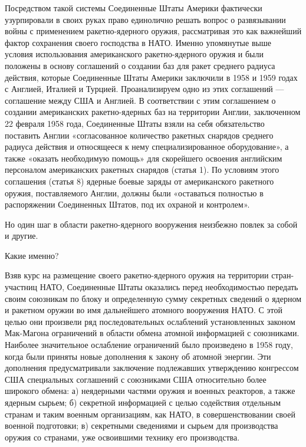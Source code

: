 \documentclass[12pt, a4paper, openany]{book}
\begin{document}
	Посредством такой системы Соединенные Штаты Америки фактически узурпировали в своих руках право единолично решать вопрос о развязывании войны с применением ракетно-ядерного оружия, рассматривая это как важнейший фактор сохранения своего господства в НАТО. Именно упомянутые выше условия использования американского ракетно-ядерного оружия и были положены в основу соглашений о создании баз для ракет среднего радиуса действия, которые Соединенные Штаты Америки заключили в 1958 и 1959 годах с Англией, Италией и Турцией. Проанализируем одно из этих соглашений — соглашение между США и Англией. В соответствии с этим соглашением о создании американских ракетно-ядерных баз на территории Англии, заключенном 22 февраля 1958 года, Соединенные Штаты взяли на себя обязательство поставить Англии «согласованное количество ракетных снарядов среднего радиуса действия и относящееся к нему специализированное оборудование», а также «оказать необходимую помощь» для скорейшего освоения английским персоналом американских ракетных снарядов (статья 1). По условиям этого соглашения (статья 8) ядерные боевые заряды от американского ракетного оружия, поставляемого Англии, должны были «оставаться полностью в распоряжении Соединенных Штатов, под их охраной и контролем».
	
	Но один шаг в области ракетно-ядерного вооружения неизбежно повлек за собой и другие.
	
	Какие именно?
	
	Взяв курс на размещение своего ракетно-ядерного оружия на территории стран-участниц НАТО, Соединенные Штаты оказались перед необходимостью передать своим союзникам по блоку и определенную сумму секретных сведений о ядерном и ракетном оружии во имя дальнейшего атомного вооружения НАТО. С этой целью они произвели ряд последовательных ослаблений установленных законом Мак-Магона ограничений в области обмена атомной информацией с союзниками. Наиболее значительное ослабление ограничений было произведено в 1958 году, когда были приняты новые дополнения к закону об атомной энергии. Эти дополнения предусматривали заключение подлежавших утверждению конгрессом США специальных соглашений с союзниками США относительно более широкого обмена: а) неядерными частями оружия и военных реакторов, а также ядерным сырьем; б) секретной информацией с целью содействия отдельным странам и таким военным организациям, как НАТО, в совершенствовании своей военной подготовки; в) секретными сведениями и сырьем для производства оружия со странами, уже освоившими технику его производства.
	
\end{document}
